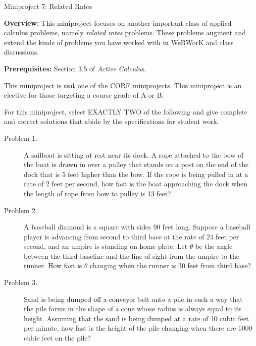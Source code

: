\documentclass[11pt,letterpaper]{article}
\begin{document}
\begin{flushright}
	\begin{Large}
		Miniproject 7: Related Rates
	\end{Large}
\end{flushright}

\noindent
\textbf{Overview:} This miniproject focuses on another important class of applied calculus problems, namely \emph{related rates} problems. These problems augment and extend the kinds of problems you have worked with in WeBWorK and class discussions. 

\medskip

\noindent
\textbf{Prerequisites:} Section 3.5 of \emph{Active Calculus.}

\medskip

\noindent
This miniproject is \textbf{not} one of the CORE miniprojects. This miniproject is an elective for those targeting a course grade of A or B. 	

\hrulefill

For this miniproject, select EXACTLY TWO of the following and give complete and correct solutions that abide by the specifications for student work. 

\begin{description}
	\item[Problem 1.] A sailboat is sitting at rest near its dock. A rope attached to the bow of the boat is drawn in over a pulley that stands on a post on the end of the dock that is 5 feet higher than the bow. If the rope is being pulled in at a rate of 2 feet per second, how fast is the boat approaching the dock when the length of rope from bow to pulley is 13 feet?
	\item[Problem 2.] A baseball diamond is a square with sides 90 feet long. Suppose a baseball player is advancing from second to third base at the rate of 24 feet per second, and an umpire is standing on home plate. Let $\theta$ be the angle between the third baseline and the line of sight from the umpire to the runner. How fast is $\theta$ changing when the runner is 30 feet from third base?
	\item[Problem 3.] Sand is being dumped off a conveyor belt onto a pile in such a way that the pile forms in the shape of a cone whose radius is always equal to its height. Assuming that the sand is being dumped at a rate of 10 cubic feet per minute, how fast is the height of the pile changing when there are 1000 cubic feet on the pile?
\end{description}
\end{document}
